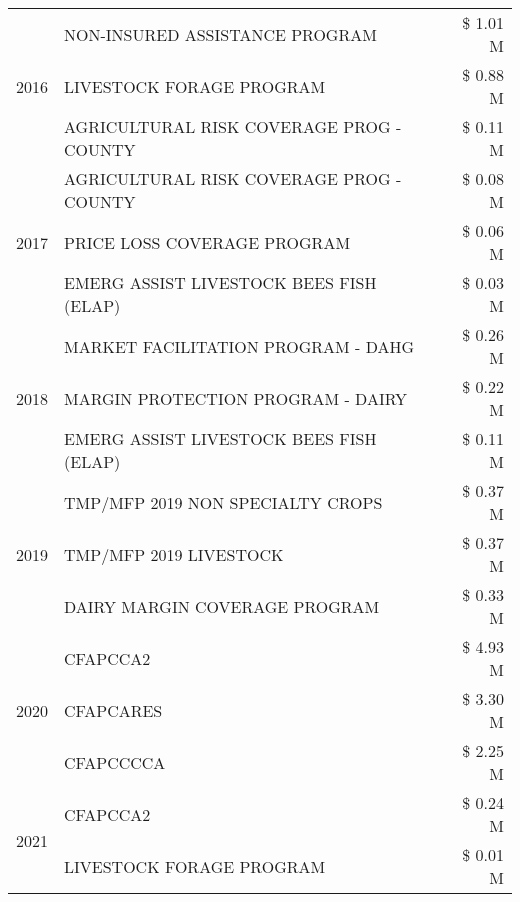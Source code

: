 \begin{tabular}{llr}
\cline{1-3}
\multirow[t]{3}{*}{2016} & NON-INSURED ASSISTANCE PROGRAM & \$ 1.01 M \\
 & LIVESTOCK FORAGE PROGRAM & \$ 0.88 M \\
 & AGRICULTURAL RISK COVERAGE PROG - COUNTY & \$ 0.11 M \\
\cline{1-3}
\multirow[t]{3}{*}{2017} & AGRICULTURAL RISK COVERAGE PROG - COUNTY & \$ 0.08 M \\
 & PRICE LOSS COVERAGE PROGRAM & \$ 0.06 M \\
 & EMERG ASSIST LIVESTOCK BEES FISH (ELAP) & \$ 0.03 M \\
\cline{1-3}
\multirow[t]{3}{*}{2018} & MARKET FACILITATION PROGRAM - DAHG & \$ 0.26 M \\
 & MARGIN PROTECTION PROGRAM - DAIRY & \$ 0.22 M \\
 & EMERG ASSIST LIVESTOCK BEES FISH (ELAP) & \$ 0.11 M \\
\cline{1-3}
\multirow[t]{3}{*}{2019} & TMP/MFP 2019 NON SPECIALTY CROPS & \$ 0.37 M \\
 & TMP/MFP 2019 LIVESTOCK & \$ 0.37 M \\
 & DAIRY MARGIN COVERAGE PROGRAM & \$ 0.33 M \\
\cline{1-3}
\multirow[t]{3}{*}{2020} & CFAPCCA2 & \$ 4.93 M \\
 & CFAPCARES & \$ 3.30 M \\
 & CFAPCCCCA & \$ 2.25 M \\
\cline{1-3}
\multirow[t]{2}{*}{2021} & CFAPCCA2 & \$ 0.24 M \\
 & LIVESTOCK FORAGE PROGRAM & \$ 0.01 M \\
\cline{1-3}
\bottomrule
\end{tabular}
